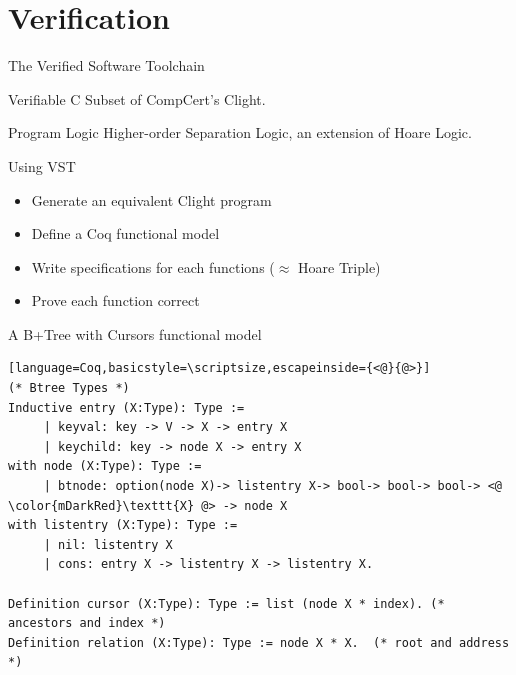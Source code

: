 \documentclass[page number,usenames,dvipsnames]{beamer}
\begin{document}
\section{Verification}
\begin{frame}{The Verified Software Toolchain}

  \begin{block}{Verifiable C}
    Subset of CompCert's Clight.
  \end{block}
  \vfill
  \begin{block}{Program Logic}
    Higher-order Separation Logic, an extension of Hoare Logic.
  \end{block}
  \vfill
  \begin{block}{Using VST}
    \begin{itemize}
    \item Generate an equivalent Clight program
    \item Define a Coq functional model
    \item Write specifications for each functions ($\approx$ Hoare Triple)
    \item Prove each function correct
    \end{itemize}
  \end{block}
  
\end{frame}

\begin{frame}[fragile]{A B+Tree with Cursors functional model}

  \begin{lstlisting}[language=Coq,basicstyle=\scriptsize,escapeinside={<@}{@>}]
(* Btree Types *)
Inductive entry (X:Type): Type :=
     | keyval: key -> V -> X -> entry X
     | keychild: key -> node X -> entry X
with node (X:Type): Type :=
     | btnode: option(node X)-> listentry X-> bool-> bool-> bool-> <@ \color{mDarkRed}\texttt{X} @> -> node X
with listentry (X:Type): Type :=
     | nil: listentry X
     | cons: entry X -> listentry X -> listentry X.

Definition cursor (X:Type): Type := list (node X * index). (* ancestors and index *)
Definition relation (X:Type): Type := node X * X.  (* root and address *)
  \end{lstlisting}
  \vspace{-1em}
  \vfill
  \cursor
  
\end{frame}
\end{document}
